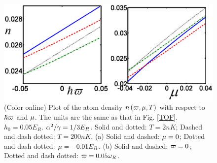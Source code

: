 \documentclass[pra,twocolumn,showpacs,floatfix]{revtex4-1}
\begin{document}
\begin{figure}[t]
\includegraphics[width=1.0\linewidth]{density.eps} \vspace{-5pt} \vspace{%
-10pt}
\caption{(Color online) Plot of the atom density $n\left( \protect\varpi ,%
\protect\mu ,T\right) $ with respect to $\hbar \protect\varpi $ and $\protect%
\mu $. The units are the same as that in Fig. \protect\ref{TOF}. $%
h_{0}=0.05E_{R}$. $\protect\alpha ^{2}/\protect\gamma =1/3E_{R}$. Solid and
dotted: $T=2nK$; Dashed and dash dotted: $T=200nK$. (a) Solid and dashed: $%
\protect\mu =0$; Dotted and dash dotted: $\protect\mu =-0.01E_{R}$. (b)
Solid and dashed: $\protect\varpi =0$; Dotted and dash dotted: $\protect%
\varpi =0.05\protect\omega _{R}$.}
\label{densityplot}
\end{figure}
\end{document}

